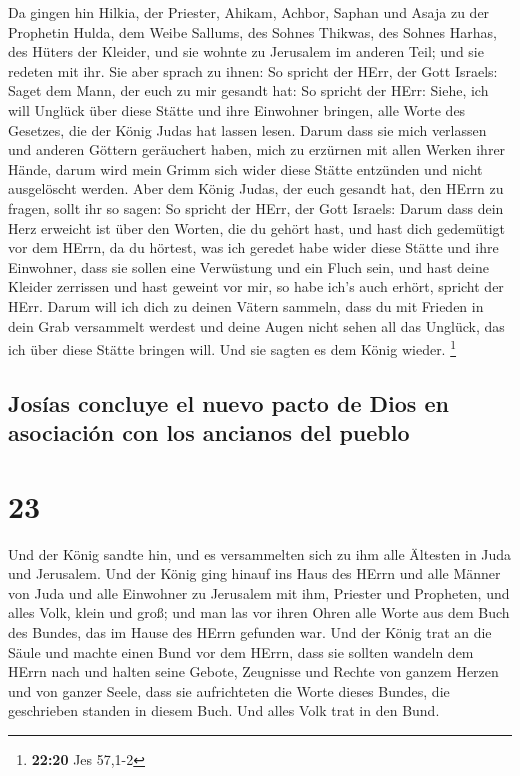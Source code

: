  Da gingen hin Hilkia, der Priester, Ahikam, Achbor,
Saphan und Asaja zu der Prophetin Hulda, dem Weibe Sallums, des Sohnes
Thikwas, des Sohnes Harhas, des Hüters der Kleider, und sie wohnte zu
Jerusalem im anderen Teil; und sie redeten mit ihr.  Sie
aber sprach zu ihnen: So spricht der HErr, der Gott Israels: Saget dem
Mann, der euch zu mir gesandt hat:  So spricht der HErr:
Siehe, ich will Unglück über diese Stätte und ihre Einwohner bringen,
alle Worte des Gesetzes, die der König Judas hat lassen lesen.
 Darum dass sie mich verlassen und anderen Göttern
geräuchert haben, mich zu erzürnen mit allen Werken ihrer Hände, darum
wird mein Grimm sich wider diese Stätte entzünden und nicht ausgelöscht
werden.  Aber dem König Judas, der euch gesandt hat, den
HErrn zu fragen, sollt ihr so sagen: So spricht der HErr, der Gott
Israels:  Darum dass dein Herz erweicht ist über den
Worten, die du gehört hast, und hast dich gedemütigt vor dem HErrn, da
du hörtest, was ich geredet habe wider diese Stätte und ihre Einwohner,
dass sie sollen eine Verwüstung und ein Fluch sein, und hast deine
Kleider zerrissen und hast geweint vor mir, so habe ich's auch erhört,
spricht der HErr.  Darum will ich dich zu deinen Vätern
sammeln, dass du mit Frieden in dein Grab versammelt werdest und deine
Augen nicht sehen all das Unglück, das ich über diese Stätte bringen
will. Und sie sagten es dem König wieder. \footnote{\textbf{22:20} Jes
  57,1-2}

\hypertarget{josuxedas-concluye-el-nuevo-pacto-de-dios-en-asociaciuxf3n-con-los-ancianos-del-pueblo}{%
\subsection{Josías concluye el nuevo pacto de Dios en asociación con los
ancianos del
pueblo}\label{josuxedas-concluye-el-nuevo-pacto-de-dios-en-asociaciuxf3n-con-los-ancianos-del-pueblo}}

\hypertarget{section-22}{%
\section{23}\label{section-22}}

 Und der König sandte hin, und es versammelten sich zu ihm
alle Ältesten in Juda und Jerusalem.  Und der König ging
hinauf ins Haus des HErrn und alle Männer von Juda und alle Einwohner zu
Jerusalem mit ihm, Priester und Propheten, und alles Volk, klein und
groß; und man las vor ihren Ohren alle Worte aus dem Buch des Bundes,
das im Hause des HErrn gefunden war.  Und der König trat
an die Säule und machte einen Bund vor dem HErrn, dass sie sollten
wandeln dem HErrn nach und halten seine Gebote, Zeugnisse und Rechte von
ganzem Herzen und von ganzer Seele, dass sie aufrichteten die Worte
dieses Bundes, die geschrieben standen in diesem Buch. Und alles Volk
trat in den Bund.

